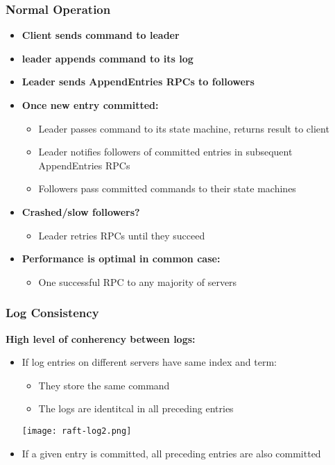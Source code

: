 \begin{frame}
    \frametitle{Normal Operation}
    \begin{itemize}
        \item \textbf{Client sends command to leader}
        \item \textbf{leader appends command to its log}
        \item \textbf{Leader sends AppendEntries RPCs to followers}
        \item \textbf{Once new entry committed:}
            \begin{itemize}
                \item Leader passes command to its state machine, returns result to client
                \item Leader notifies followers of committed entries in subsequent AppendEntries RPCs
                \item Followers pass committed commands to their state machines
            \end{itemize}
        \item \textbf{Crashed/slow followers?}
            \begin{itemize}
                \item Leader retries RPCs until they succeed
            \end{itemize}
        \item \textbf{Performance is optimal in common case:}
            \begin{itemize}
                \item One successful RPC to any majority of servers
            \end{itemize}
    \end{itemize}
\end{frame}

\begin{frame}
    \frametitle{Log Consistency}
    \textbf{High level of conherency between logs:}
    \begin{itemize}
        \item If log entries on different servers have same index and term:
            \begin{itemize}
                \item They store the same command
                \item The logs are identitcal in all preceding entries
            \end{itemize}
        \texttt{[image: raft-log2.png]}
        \item If a given entry is committed, all preceding entries are also committed
    \end{itemize}
\end{frame}

